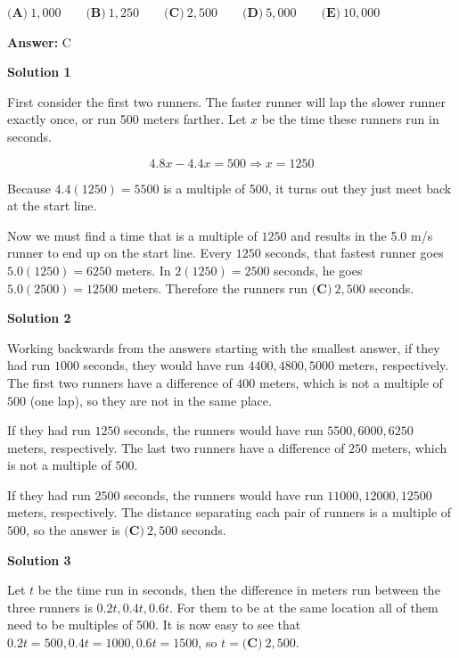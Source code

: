\begin{enumerate}
 $\textbf{(A)}\ 1,000\qquad\textbf{(B)}\ 1,250\qquad\textbf{(C)}\ 2,500\qquad\textbf{(D)}\ 5,000\qquad\textbf{(E)}\ 10,000$

 \textbf{Answer: }C



\textbf{Solution 1}

First consider the first two runners. The faster runner will lap the slower runner exactly once, or run 500 meters farther. Let $x$ be the time these runners run in seconds.

 
 \[4.8x-4.4x=500 \Rightarrow x=1250\]

 Because $4.4(1250)=5500$ is a multiple of 500, it turns out they just meet back at the start line.

 Now we must find a time that is a multiple of $1250$ and results in the 5.0 m/s runner to end up on the start line. Every $1250$ seconds, that fastest runner goes $5.0(1250)=6250$ meters. In $2(1250)=2500$ seconds, he goes $5.0(2500)=12500$ meters. Therefore the runners run $\boxed{\textbf{(C)}\ 2,500}$ seconds.

 



\textbf{Solution 2}

Working backwards from the answers starting with the smallest answer, if they had run $1000$ seconds, they would have run $4400, 4800, 5000$ meters, respectively.  The first two runners have a difference of $400$ meters, which is not a multiple of $500$ (one lap), so they are not in the same place.

 If they had run $1250$ seconds, the runners would have run $5500, 6000, 6250$ meters, respectively.  The last two runners have a difference of $250$ meters, which is not a multiple of $500$.

 If they had run $2500$ seconds, the runners would have run $11000, 12000, 12500$ meters, respectively.  The distance separating each pair of runners is a multiple of $500$, so the answer is $\boxed{\textbf{(C)}\ 2,500}$ seconds.

 



\textbf{Solution 3}

Let $t$ be the time run in seconds, then the difference in meters run between the three runners is $0.2t, 0.4t, 0.6t$. For them to be at the same location all of them need to be multiples of 500. It is now easy to see that $0.2t=500, 0.4t=1000, 0.6t=1500$, so $t=\boxed{\textbf{(C)}\ 2,500}$.

 




\end{enumerate}
